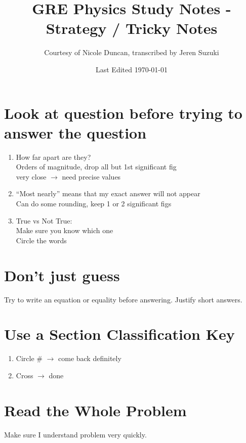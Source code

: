 \documentclass[10pt,letter]{article}
\title{GRE Physics Study Notes - Strategy / Tricky Notes}
\author{Courtesy of Nicole Duncan, transcribed by Jeren Suzuki}
\date{Last Edited \today}
\begin{document}
\maketitle
{}
\newpage
\tableofcontents
\newpage
{}


\section{Look at question before trying to answer the question}
\begin{enumerate}
    \item How far apart are they? \\ 
    Orders of magnitude, drop all but 1st significant fig\\
    very close $\rightarrow$ need precise values
    \item ``Most nearly'' means that my exact answer will not appear\\
    Can do some rounding, keep 1 or 2 significant figs
    \item True vs Not True: \\
    Make sure you know which one\\
    Circle the words
\end{enumerate}

\section{Don't just guess} %
\label{sec:don_t_just_guess}
Try to write an equation or equality before answering. Justify short answers.

\section{Use a Section Classification Key} %
\label{sec:use_a_section_classification_key}
\begin{enumerate}
    \item Circle \# $\rightarrow$ come back definitely 
    \item Cross $\rightarrow$ done
\end{enumerate}

\section{Read the Whole Problem} %
\label{sec:read_the_whole_problem}
Make sure I understand problem very quickly.
\end{document}
